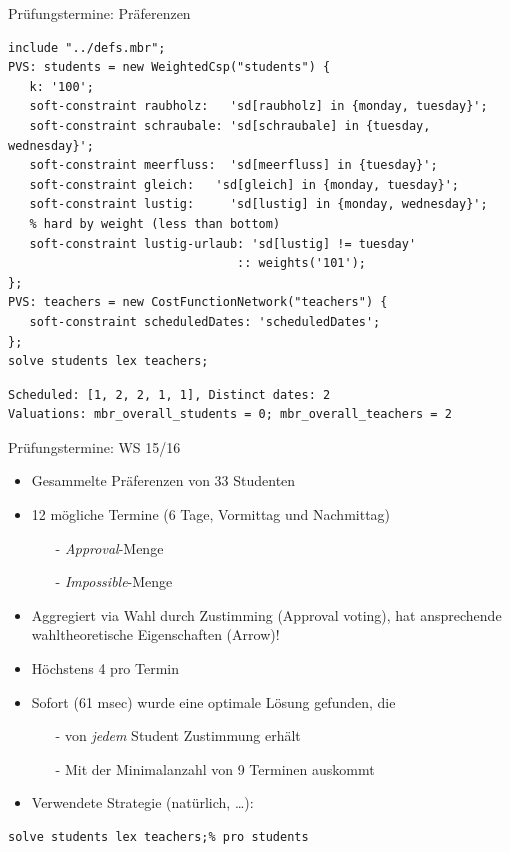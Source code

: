\documentclass[handout,10pt,xcolor={dvipsnames},fleqn]{beamer}
\begin{document}
\begin{frame}[fragile]{Prüfungstermine: Präferenzen}

\begin{lstlisting}
include "../defs.mbr";
PVS: students = new WeightedCsp("students") {
   k: '100';
   soft-constraint raubholz:   'sd[raubholz] in {monday, tuesday}';   
   soft-constraint schraubale: 'sd[schraubale] in {tuesday, wednesday}';
   soft-constraint meerfluss:  'sd[meerfluss] in {tuesday}';
   soft-constraint gleich:   'sd[gleich] in {monday, tuesday}';
   soft-constraint lustig:     'sd[lustig] in {monday, wednesday}';
   % hard by weight (less than bottom)
   soft-constraint lustig-urlaub: 'sd[lustig] != tuesday'
                                :: weights('101'); 
}; 
PVS: teachers = new CostFunctionNetwork("teachers") {
   soft-constraint scheduledDates: 'scheduledDates';
}; 
solve students lex teachers;
\end{lstlisting}
\begin{Verbatim}[fontsize=\small]
Scheduled: [1, 2, 2, 1, 1], Distinct dates: 2
Valuations: mbr_overall_students = 0; mbr_overall_teachers = 2
\end{Verbatim}
\end{frame}


\begin{frame}[fragile]{Prüfungstermine: WS 15/16}

\begin{itemize}
\item Gesammelte Präferenzen von 33 Studenten
\item 12 mögliche Termine (6 Tage, Vormittag und Nachmittag)
\begin{itemize}
\item[-] \emph{Approval}-Menge 
\item[-] \emph{Impossible}-Menge
\end{itemize}

\vspace*{2ex}

\item Aggregiert via Wahl durch Zustimming (\alert{Approval voting}), hat ansprechende wahltheoretische Eigenschaften (Arrow)!
\item Höchstens 4 pro Termin

\item Sofort (61 msec) wurde eine optimale Lösung gefunden, die
\begin{itemize}
\item[-] von \emph{jedem} Student Zustimmung erhält
\item[-] Mit der Minimalanzahl von 9 Terminen auskommt
\end{itemize}
\item Verwendete Strategie (natürlich, \ldots):
\end{itemize}
\begin{lstlisting}
solve students lex teachers;% pro students
\end{lstlisting}
\end{frame}
\end{document}

